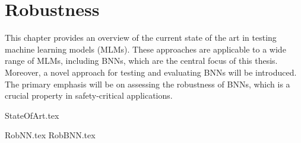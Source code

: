 \documentclass[
	a4paper,
	cleardoublepage=empty,
	headings=twolinechapter,
	numbers=autoenddot,
]{scrbook}
\begin{document}
	\chapter{Robustness}
	
	This chapter provides an overview of the current state of the art in testing machine learning models (MLMs). These approaches are applicable to a wide range of MLMs, including BNNs, which are the central focus of this thesis. Moreover, a novel approach for testing and evaluating BNNs will be introduced. The primary emphasis will be on assessing the robustness of BNNs, which is a crucial property in safety-critical applications.
	
	{StateOfArt.tex}
	
	{RobNN.tex}
	{RobBNN.tex}
	
	
	
	
	
\end{document}
